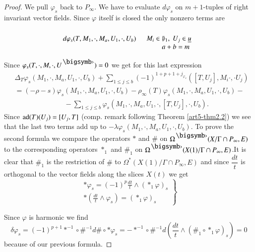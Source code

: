 \begin{proof}
We pull $\varphi_s$ back to $P_\infty$. We have to evaluate $d \varphi_s$ on $m+1$-tuples of right invariant vector fields. Since $\varphi$ itself is closed the only nonzero terms are
$$
d \varphi_s (T, M_1, \cdot , M_a, U_1, \cdot , U_b )  \quad 
\begin{array}{c}
\\
M_i \in \bar{\mathfrak{p}}_1, \; U_j \in \underline{u}\\
\qquad a + b = m
\end{array}
$$

Since $\varphi_s (T, \cdot , M, \cdot, U^\bigdot) =0$ we get for this last expression
\begin{align*}
& \Delta_{T} \varphi_s (M_1, \cdot , M_a, U_1, \cdot , U_b) + \sum\limits_{1 \leqslant j \leqslant b} (-1)^{1+ p + 1 + j_{\varphi_s}} ([T, U_j], M_i \cdot , \cdot U_j)\\
& = (-\rho -s) \varphi_s (M_1, \cdot, M_a, U_1, \cdot , U_b) - \rho_\infty (T)\varphi_s (M_1, \cdot, M_a, U_1, \cdot , U_b) - \\
& \hspace{3cm} - \sum\limits_{1 \leqslant j \leqslant b} \varphi_s (M_1, \cdot, M_a, U_1, \cdot , [T, U_j], \cdot , U_b).
\end{align*}
Since $\operatorname{ad} (T) (U_j) = [U_j, T]$ (comp. remark following Theorem \ref{art5-thm2.2}) we see that the last two terms add up to $- \lambda \varphi_s (M_1, \cdot, M_a, U_1, \cdot , U_b)$. To prove the second formula we compare the operators $\ast$ and $\#$ on $\Omega^\bigdot (X/ \Gamma \cap P_\infty, E)$ to the corresponding operators $\ast_1$ and $\#_1$ on $\Omega^\bigdot (X(1)/ \Gamma \cap P_\infty, E)$.\pageoriginale It is clear that $\#_1$ is the restriction of $\#$ to $\Omega^\ast (X(1)/\Gamma \cap P_\infty, E)$ and since $\dfrac{dt}{t}$ is orthogonal to the vector fields along the slices $X(t)$ we get
\begin{equation}
\left. 
\begin{aligned}
\ast \varphi_s = (-1)^p \frac{dt}{t} \wedge (\ast_1 \varphi)_s \\
\ast \left(\frac{dt}{t}\wedge\varphi_s \right) =(\ast_1 \varphi)_s
\end{aligned}
\right\}
\label{art5-eq3.2}
\end{equation}

Since $\varphi$ is harmonic we find
$$
\delta \varphi_s = (-1)^{p+1} \ast^{-1} \circ \#^{-1} d \# \circ \ast \varphi_s = -\ast^{-1} \circ \#^{-1} d \left(\frac{dt}{t} \wedge (\#_1 \circ \ast_1 \varphi)_s \right) = 0
$$
because of our previous formula.


\end{proof}
